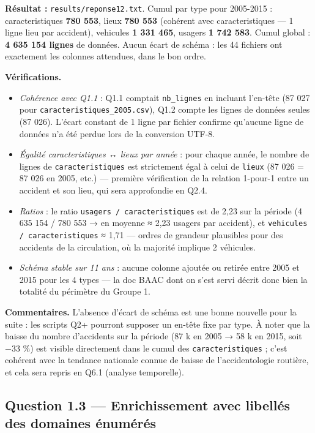\documentclass[11pt,a4paper]{article}
\newcommand{\rub}[2]{\textbf{\textcolor{#1}{#2}}}
\begin{document}
\rub{labresultat}{Résultat :} \texttt{results/reponse12.txt}. Cumul par type pour 2005-2015 : caracteristiques \textbf{780 553}, lieux \textbf{780 553} (cohérent avec caracteristiques — 1 ligne lieu par accident), vehicules \textbf{1 331 465}, usagers \textbf{1 742 583}. Cumul global : \textbf{4 635 154 lignes} de données. Aucun écart de schéma : les 44 fichiers ont exactement les colonnes attendues, dans le bon ordre.

\rub{labanalyse}{Vérifications.}

\begin{itemize}
\item \emph{Cohérence avec Q1.1} : Q1.1 comptait \texttt{nb\_lignes} en incluant l'en-tête (87 027 pour \texttt{caracteristiques\_2005.csv}), Q1.2 compte les lignes de données seules (87 026). L'écart constant de 1 ligne par fichier confirme qu'aucune ligne de données n'a été perdue lors de la conversion UTF-8.
\item \emph{Égalité caracteristiques ↔ lieux par année} : pour chaque année, le nombre de lignes de \texttt{caracteristiques} est strictement égal à celui de \texttt{lieux} (87 026 = 87 026 en 2005, etc.) — première vérification de la relation 1-pour-1 entre un accident et son lieu, qui sera approfondie en Q2.4.
\item \emph{Ratios} : le ratio \texttt{usagers / caracteristiques} est de 2,23 sur la période (4 635 154 / 780 553 → en moyenne ≈ 2,23 usagers par accident), et \texttt{vehicules / caracteristiques} ≈ 1,71 — ordres de grandeur plausibles pour des accidents de la circulation, où la majorité implique 2 véhicules.
\item \emph{Schéma stable sur 11 ans} : aucune colonne ajoutée ou retirée entre 2005 et 2015 pour les 4 types — la doc BAAC dont on s'est servi décrit donc bien la totalité du périmètre du Groupe 1.
\end{itemize}

\rub{labcomment}{Commentaires.} L'absence d'écart de schéma est une bonne nouvelle pour la suite : les scripts Q2+ pourront supposer un en-tête fixe par type. À noter que la baisse du nombre d'accidents sur la période (87 k en 2005 → 58 k en 2015, soit −33 \%) est visible directement dans le cumul des \texttt{caracteristiques} ; c'est cohérent avec la tendance nationale connue de baisse de l'accidentologie routière, et cela sera repris en Q6.1 (analyse temporelle).

\clearpage
\subsection*{Question 1.3 — Enrichissement avec libellés des domaines énumérés}
\end{document}
